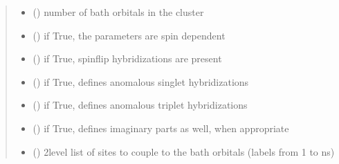 \documentclass[letterpaper,10pt,english]{sphinxmanual}
\begin{document}
\begin{fulllineitems}
\begin{fulllineitems}
\begin{quote}
\begin{description}
\begin{itemize}
\item {} 
\sphinxAtStartPar
{} () \textendash{} number of bath orbitals in the cluster

\item {} 
\sphinxAtStartPar
{} () \textendash{} if True, the parameters are spin dependent

\item {} 
\sphinxAtStartPar
{} () \textendash{} if True, spin\sphinxhyphen{}flip hybridizations are present

\item {} 
\sphinxAtStartPar
{} () \textendash{} if True, defines anomalous singlet hybridizations

\item {} 
\sphinxAtStartPar
{} () \textendash{} if True, defines anomalous triplet hybridizations

\item {} 
\sphinxAtStartPar
{} () \textendash{} if True, defines imaginary parts as well, when appropriate

\item {} 
\sphinxAtStartPar
{} (\sphinxstyleliteralemphasis{\sphinxupquote{{[}}}\sphinxstyleliteralemphasis{\sphinxupquote{{[}}}\sphinxstyleliteralemphasis{\sphinxupquote{{]}}}\sphinxstyleliteralemphasis{\sphinxupquote{{]}}}) \textendash{} 2\sphinxhyphen{}level list of sites to couple to the bath orbitals (labels from 1 to ns)

\end{itemize}

\end{description}\end{quote}

\end{fulllineitems}


\end{fulllineitems}
\end{document}
